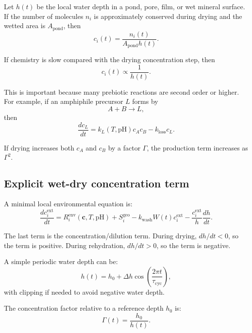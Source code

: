 \documentclass[11pt]{article}
\begin{document}
Let $h(t)$ be the local water depth in a pond, pore, film, or wet mineral
surface. If the number of molecules $n_i$ is approximately conserved during
drying and the wetted area is $A_{\mathrm{pond}}$, then
\begin{equation}
    c_i(t)
    =
    \frac{n_i(t)}
    {A_{\mathrm{pond}}h(t)}.
\end{equation}

If chemistry is slow compared with the drying concentration step, then
\begin{equation}
    c_i(t) \propto \frac{1}{h(t)}.
\end{equation}

This is important because many prebiotic reactions are second order or higher.
For example, if an amphiphile precursor $L$ forms by
\begin{equation}
    A+B\rightarrow L,
\end{equation}
then
\begin{equation}
    \frac{dc_L}{dt}
    =
    k_L(T,\mathrm{pH})c_Ac_B
    -
    k_{\mathrm{loss}}c_L.
\end{equation}

If drying increases both $c_A$ and $c_B$ by a factor $\Gamma$, the production
term increases as $\Gamma^2$.

\subsection{Explicit wet-dry concentration term}

A minimal local environmental equation is:
\begin{equation}
    \frac{dc_i^{\mathrm{ext}}}{dt}
    =
    R_i^{\mathrm{env}}(\mathbf{c},T,\mathrm{pH})
    +
    S_i^{\mathrm{geo}}
    -
    k_{\mathrm{wash}}W(t)c_i^{\mathrm{ext}}
    -
    \frac{c_i^{\mathrm{ext}}}{h}
    \frac{dh}{dt}.
\end{equation}

The last term is the concentration/dilution term. During drying,
$dh/dt<0$, so the term is positive. During rehydration, $dh/dt>0$, so the
term is negative.

A simple periodic water depth can be:
\begin{equation}
    h(t)
    =
    h_0
    +
    \Delta h
    \cos\left(\frac{2\pi t}{\tau_{\mathrm{cyc}}}\right),
\end{equation}
with clipping if needed to avoid negative water depth.

The concentration factor relative to a reference depth $h_0$ is:
\begin{equation}
    \Gamma(t) =
    \frac{h_0}{h(t)}.
\end{equation}
\end{document}
